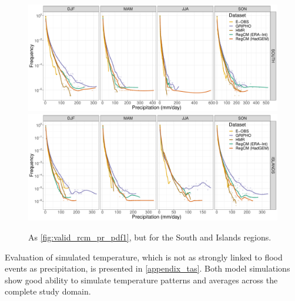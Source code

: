 \begin{figure}
    \centering
        \includegraphics[width=0.8\textheight]{figures/valid_rcm/pr/pdf_SOUTH_lines}
        \includegraphics[width=0.8\textheight]{figures/valid_rcm/pr/pdf_ISLANDS_lines}
    \decoRule
    \caption[Validation of RegCM precipitation PDFs (2)]{
        As \cref{fig:valid_rcm_pr_pdf1}, but for the South and Islands regions.
    }\label{fig:valid_rcm_pr_pdf2}
\end{figure}

Evaluation of simulated temperature, which is not as strongly linked to flood events as precipitation, is presented in \cref{appendix_tas}.
Both model simulations show good ability to simulate temperature patterns and averages across the complete study domain.

